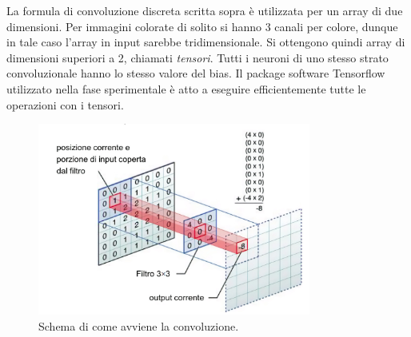 La formula di convoluzione discreta scritta sopra è utilizzata per un array di due dimensioni. Per immagini
 colorate di solito si hanno 3 canali per colore, dunque in tale caso l’array 
 in input sarebbe tridimensionale. Si ottengono quindi array di dimensioni superiori a 2, 
 chiamati \emph{tensori}.
Tutti i neuroni di uno stesso strato convoluzionale hanno lo stesso valore del bias. 
 Il package software Tensorflow utilizzato nella fase sperimentale è atto a eseguire 
 efficientemente tutte le operazioni con i tensori. 
 \begin{figure}[H]
     \centering
     \includegraphics[width=0.8\textwidth]{Figures/convoluzione.jpg}
     \caption{\small{
          Schema di come avviene la convoluzione.~\cite{cnn}
     }
     } %
     \label{fi:dcalc}
   \end{figure}
